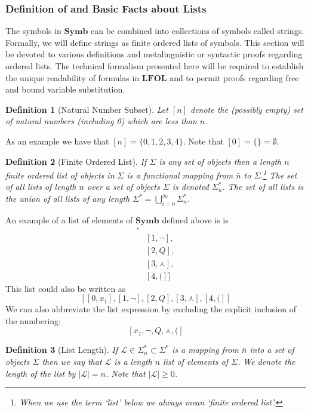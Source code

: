 \documentclass[12pt]{article}
\theoremstyle{break}
\newtheorem{definition}{Definition}[section]
\theoremstyle{break}
\theoremstyle{break}
\theoremstyle{break}
\theoremstyle{break}
\newtheorem{informal definition}[definition]{Informal Definition}
\newcommand{\mc}[1]{\mathcal{#1}}
\begin{document}
\subsubsection{Definition of and Basic Facts about Lists}
The symbols in $\textbf{Symb}$ can be combined into collections of symbols called strings.
Formally, we will define strings as finite ordered lists of symbols.
This section will be devoted to various definitions and metalinguistic or syntactic proofs regarding ordered lists.
The technical formalism presented here will be required to establish the unique readability of formulas in $\textbf{LFOL}$ and to permit proofs regarding free and bound variable substitution.

\begin{definition}[Natural Number Subset]
Let $[n]$ denote the (possibly empty) set of natural numbers (including 0) which are less than $n$.
\end{definition}

As an example we have that $[n] = \{0, 1, 2, 3, 4\}$.
Note that $[0] = \{\} = \emptyset$.

\begin{definition}[Finite Ordered List]
If $\Sigma$ is any set of objects then a length $n$ finite ordered list of objects in $\Sigma$ is a functional mapping from $\bar{n}$ to $\Sigma$.\footnote{When we use the term `list' below we always mean `finite ordered list'.}
The set of all lists of length $n$ over a set of objects $\Sigma$ is denoted $\Sigma_n^*$.
The set of all lists is the union of all lists of any length $\Sigma^* = \bigcup_{i=0}^{\infty} \Sigma_n^*$.
\end{definition}


An example of a list of elements of $\textbf{Symb}$ defined above is is
\begin{align*}
[&[0, x_1],\\
&[1, \lnot],\\
&[2, Q],\\
&[3, \curlywedge],\\
&[4, (]]
\end{align*}
This list could also be written as
$$
[[0, x_1], [1, \lnot], [2, Q], [3, \curlywedge], [4, (]]
$$
We can also abbreviate the list expression by excluding the explicit inclusion of the numbering:
$$
[x_1, \lnot, Q, \curlywedge, (]
$$

\begin{definition}[List Length]
If $\mc{L}\in\Sigma_n^*\subset \Sigma^*$ is a mapping from $\bar{n}$ into a set of objects $\Sigma$ then we say that $\mc{L}$ is a length $n$ list of elements of $\Sigma$.
We denote the length of the list by $|\mc{L}| = n$.
Note that $|\mc{L}| \ge 0$.
\end{definition}
\end{document}
